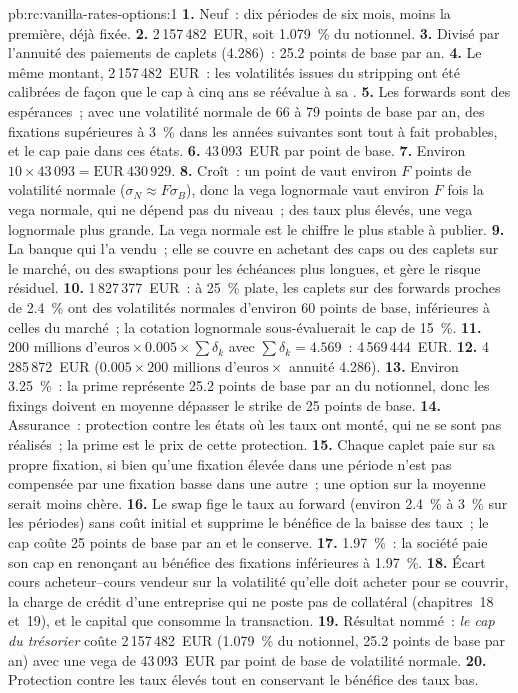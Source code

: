 \begin{solution}{pb:rc:vanilla-rates-options:1}
\textbf{1.} Neuf~: dix périodes de six mois, moins la première, déjà fixée.
\textbf{2.} 2\,157\,482~EUR, soit 1.079~\% du notionnel.
\textbf{3.} Divisé par l'annuité des paiements de caplets (4.286)~: 25.2 points de base
par an.
\textbf{4.} Le même montant, 2\,157\,482~EUR~: les volatilités issues du stripping ont été calibrées de
façon que le cap à cinq ans se réévalue à sa .
\textbf{5.} Les forwards sont des espérances~; avec une volatilité normale de 66 à 79 points
de base par an, des fixations supérieures à 3~\% dans les années suivantes sont tout à fait
probables, et le cap paie dans ces états.
\textbf{6.} 43\,093~EUR par point de base.
\textbf{7.} Environ $10\times43\,093 = \text{EUR}~430\,929$.
\textbf{8.} Croît~: un point de  vaut environ $F$ points de
volatilité normale ($\sigma_N\approx F\sigma_B$), donc la vega lognormale vaut environ
$F$ fois la vega normale, qui ne dépend pas du niveau~; des taux plus élevés,
une vega lognormale plus grande. La vega normale est le chiffre le plus stable à publier.
\textbf{9.} La banque qui l'a vendu~; elle se couvre en achetant des caps ou des caplets sur le
marché, ou des swaptions pour les échéances plus longues, et gère le risque résiduel.
\textbf{10.} 1\,827\,377~EUR~: à 25~\% plate, les caplets sur des forwards proches de
2.4~\% ont des volatilités normales d'environ 60 points de base, inférieures à celles du marché~;
la cotation lognormale sous-évaluerait le cap de 15~\%.
\textbf{11.} $200\text{ millions d'euros}\times0.005\times\sum\delta_k$ avec $\sum\delta_k =
4.569$~: 4\,569\,444~EUR.
\textbf{12.} 4\,285\,872~EUR ($0.005\times200\text{ millions d'euros}\times$ annuité 4.286).
\textbf{13.} Environ 3.25~\%~: la prime représente 25.2 points de base par an du
notionnel, donc les fixings doivent en moyenne dépasser le strike de 25 points de base.
\textbf{14.} Assurance~: protection contre les états où les taux ont monté,
qui ne se sont pas réalisés~; la prime est le prix de cette protection.
\textbf{15.} Chaque caplet paie sur sa propre fixation, si bien qu'une fixation élevée dans une période
n'est pas compensée par une fixation basse dans une autre~; une option sur la moyenne serait moins chère.
\textbf{16.} Le swap fige le taux au forward (environ 2.4~\% à 3~\% sur les
périodes) sans coût initial et supprime le bénéfice de la baisse des taux~; le cap
coûte 25 points de base par an et le conserve.
\textbf{17.} 1.97~\%~: la société paie son cap en renonçant au bénéfice des
fixations inférieures à 1.97~\%.
\textbf{18.} Écart cours acheteur--cours vendeur sur la volatilité qu'elle doit acheter pour se couvrir, la charge
de crédit d'une entreprise qui ne poste pas de collatéral (chapitres~18 et~19), et le
capital que consomme la transaction.
\textbf{19.} Résultat nommé~: \emph{le cap du trésorier} coûte 2\,157\,482~EUR (1.079~\%
du notionnel, 25.2 points de base par an) avec une vega de 43\,093~EUR par point de base
de volatilité normale.
\textbf{20.} Protection contre les taux élevés tout en conservant le bénéfice des taux bas.
\end{solution}

